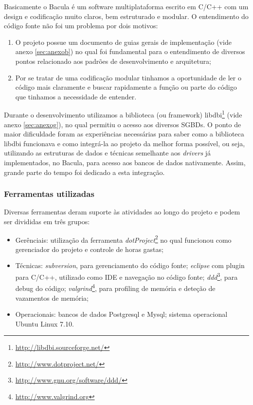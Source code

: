 Basicamente o Bacula é um software multiplataforma escrito em C/C++ com um design e codificação muito claros, bem estruturado e modular. O entendimento do código fonte não foi um problema por dois motivos: 
\begin{enumerate}
\item O projeto possue um documento de guias gerais de implementação (vide anexo \ref{sec:anexob}) no qual foi fundamental para o entendimento de diversos pontos relacionado aos padrões de desenvolvimento e arquitetura;
\item Por se tratar de uma codificação modular tinhamos a oportunidade de ler o código mais claramente e buscar rapidamente a função ou parte do código que tinhamos a necessidade de entender.
\end{enumerate}
Durante o desenvolvimento utilizamos a biblioteca (ou framework) libdbi\footnote{\url{http://libdbi.sourceforge.net/}} (vide anexo \ref{sec:anexog}), no qual permitiu o acesso aos diversos SGBDs. O ponto de maior dificuldade foram as experiências necessárias para saber como a biblioteca libdbi funcionava e como integrá-la ao projeto da melhor forma possível, ou seja, utilizando as estruturas de dados e técnicas semelhante aos \textit{drivers} já implementados, no Bacula, para acesso aos bancos de dados nativamente. Assim, grande parte do tempo foi dedicado a esta integração. 

\subsubsection{Ferramentas utilizadas}

Diversas ferramentas deram suporte às atividades ao longo do projeto e podem ser divididas em três grupos: 
\begin{itemize}
 \item Gerênciais: utilização da ferramenta \textit{dotProject}\footnote{\url{http://www.dotproject.net/}} no qual funcionou como gerenciador do projeto e controle de horas gastas;
 \item Técnicas: \textit{subversion}, para gerenciamento do código fonte; \textit{eclipse} com plugin para C/C++, utilizado como IDE e navegação no código fonte; \textit{ddd}\footnote{\url{http://www.gnu.org/software/ddd/}}, para debug do código; \textit{valgrind}\footnote{\url{http://www.valgrind.org}}, para profiling de memória e deteção de vazamentos de memória;
 \item Operacionais: bancos de dados Postgresql e Mysql; sistema operacional Ubuntu Linux 7.10.
\end{itemize}

